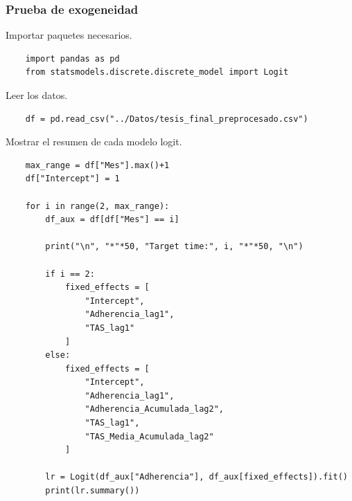 \documentclass[spanish]{article}
\numberwithin{figure}{subsection}
\numberwithin{equation}{subsection}
\numberwithin{table}{subsection}
\begin{document}
\subsubsection{Prueba de exogeneidad}


Importar paquetes necesarios.

\begin{lstlisting}
	import pandas as pd
	from statsmodels.discrete.discrete_model import Logit
\end{lstlisting}

Leer los datos.

\begin{lstlisting}
	df = pd.read_csv("../Datos/tesis_final_preprocesado.csv")
\end{lstlisting}

Mostrar el resumen de cada modelo logit.

\begin{lstlisting}
	max_range = df["Mes"].max()+1
	df["Intercept"] = 1
	
	for i in range(2, max_range):
		df_aux = df[df["Mes"] == i]
	
		print("\n", "*"*50, "Target time:", i, "*"*50, "\n")
	
		if i == 2:
			fixed_effects = [
				"Intercept",
				"Adherencia_lag1",
				"TAS_lag1"
			]
		else:
			fixed_effects = [
				"Intercept",
				"Adherencia_lag1",
				"Adherencia_Acumulada_lag2",
				"TAS_lag1",
				"TAS_Media_Acumulada_lag2"
			]
	
		lr = Logit(df_aux["Adherencia"], df_aux[fixed_effects]).fit()
		print(lr.summary())
\end{lstlisting}

\newpage
\nocite{*}
\renewcommand{\refname}{Bibliografía}

\end{document}
